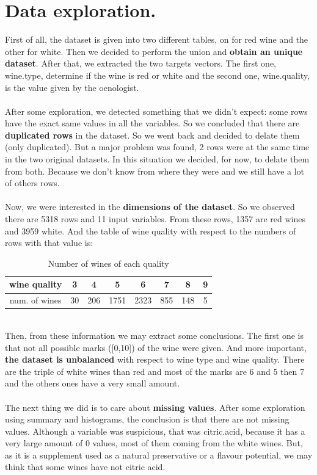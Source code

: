 \documentclass[10pt]{article}
\begin{document}
\section{Data exploration.}
First of all, the dataset is given into two different tables, on for red wine and the other for white. Then we decided to perform the union and \textbf{obtain an unique dataset}. After that, we extracted the two targets vectors. The first one, wine.type, determine if the wine is red or white and the second one, wine.quality, is the value given by the oenologist. \\ \ \\
After some exploration, we detected something that we didn't expect: some rows have the exact same values in all the variables. So we concluded that there are \textbf{duplicated rows} in the dataset. So we went back and decided to delate them (only duplicated). But a major problem was found, 2 rows were at the same time in the two original datasets. In this situation we decided, for now, to delate them from both. Because we don't know from where they were and we still have a lot of others rows. \\ \ \\
Now, we were interested in the \textbf{dimensions of the dataset}. So we observed there are 5318 rows and 11 input variables. From these rows, 1357 are red wines and 3959 white. And the table of wine quality with respect to the numbers of rows with that value is:
\begin{table}[H]
\caption{Number of wines of each quality}
\centering
\begin{tabular}{|c|c|c|c|c|c|c|c|}
\hline
wine quality  & 3  & 4   & 5    & 6    & 7    & 8   & 9 \\ \hline
num. of wines & 30 & 206 & 1751 & 2323 & 855  & 148 & 5 \\ \hline
\end{tabular}
\end{table}
\ \\
Then, from these information we may extract some conclusions. The first one is that not all possible marks ([0,10]) of the wine were given. And more important, \textbf{the dataset is unbalanced} with respect to wine type and wine quality. There are the triple of white wines than red and most of the marks are 6 and 5 then 7 and the others ones have a very small amount. \\ \ \\
The next thing we did is to care about \textbf{missing values}. After some exploration using summary and histograms, the conclusion is that there are not missing values. Although a variable was suspicious, that was citric.acid, because it has a very large amount of 0 values, most of them coming from the white wines. But, as it is a supplement used as a natural preservative or a flavour potential, we may think that some wines have not citric acid. \\ \ \\
\end{document}

